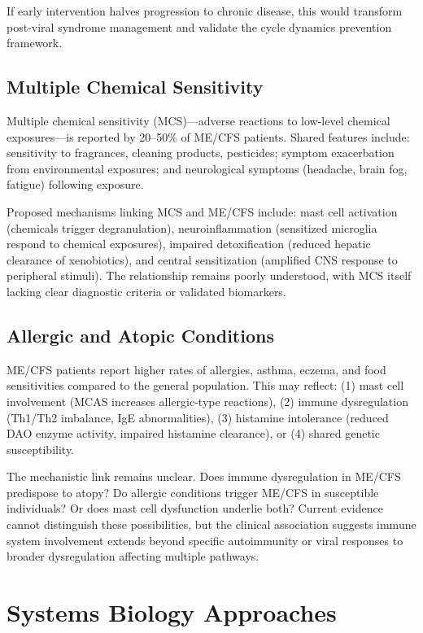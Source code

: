 If early intervention halves progression to chronic disease, this would transform post-viral syndrome management and validate the cycle dynamics prevention framework.

\subsection{Multiple Chemical Sensitivity}

Multiple chemical sensitivity (MCS)---adverse reactions to low-level chemical exposures---is reported by 20--50\% of ME/CFS patients. Shared features include: sensitivity to fragrances, cleaning products, pesticides; symptom exacerbation from environmental exposures; and neurological symptoms (headache, brain fog, fatigue) following exposure.

Proposed mechanisms linking MCS and ME/CFS include: mast cell activation (chemicals trigger degranulation), neuroinflammation (sensitized microglia respond to chemical exposures), impaired detoxification (reduced hepatic clearance of xenobiotics), and central sensitization (amplified CNS response to peripheral stimuli). The relationship remains poorly understood, with MCS itself lacking clear diagnostic criteria or validated biomarkers.

\subsection{Allergic and Atopic Conditions}

ME/CFS patients report higher rates of allergies, asthma, eczema, and food sensitivities compared to the general population. This may reflect: (1) mast cell involvement (MCAS increases allergic-type reactions), (2) immune dysregulation (Th1/Th2 imbalance, IgE abnormalities), (3) histamine intolerance (reduced DAO enzyme activity, impaired histamine clearance), or (4) shared genetic susceptibility.

The mechanistic link remains unclear. Does immune dysregulation in ME/CFS predispose to atopy? Do allergic conditions trigger ME/CFS in susceptible individuals? Or does mast cell dysfunction underlie both? Current evidence cannot distinguish these possibilities, but the clinical association suggests immune system involvement extends beyond specific autoimmunity or viral responses to broader dysregulation affecting multiple pathways.

\section{Systems Biology Approaches}
\label{sec:systems-biology}

